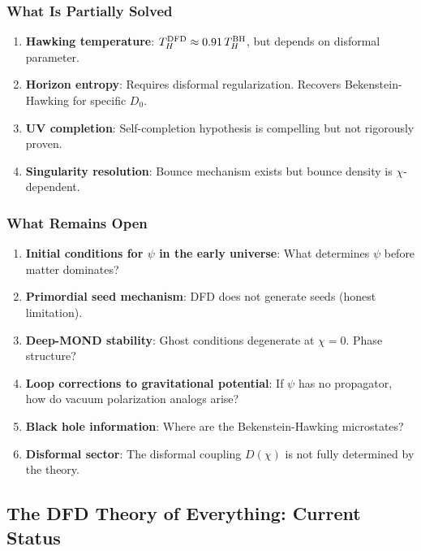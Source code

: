 \documentclass[11pt,a4paper]{article}
\begin{document}
\subsubsection{What Is Partially Solved}

\begin{enumerate}
\item \textbf{Hawking temperature}: $T_H^{\rm DFD} \approx 0.91\,T_H^{\rm BH}$, but depends on disformal parameter.
\item \textbf{Horizon entropy}: Requires disformal regularization. Recovers Bekenstein-Hawking for specific $D_0$.
\item \textbf{UV completion}: Self-completion hypothesis is compelling but not rigorously proven.
\item \textbf{Singularity resolution}: Bounce mechanism exists but bounce density is $\chi$-dependent.
\end{enumerate}

\subsubsection{What Remains Open}

\begin{enumerate}
\item \textbf{Initial conditions for $\psi$ in the early universe}: What determines $\psi$ before matter dominates?
\item \textbf{Primordial seed mechanism}: DFD does not generate seeds (honest limitation).
\item \textbf{Deep-MOND stability}: Ghost conditions degenerate at $\chi = 0$. Phase structure?
\item \textbf{Loop corrections to gravitational potential}: If $\psi$ has no propagator, how do vacuum polarization analogs arise?
\item \textbf{Black hole information}: Where are the Bekenstein-Hawking microstates?
\item \textbf{Disformal sector}: The disformal coupling $D(\chi)$ is not fully determined by the theory.
\end{enumerate}

\subsection{The DFD Theory of Everything: Current Status}
\end{document}
